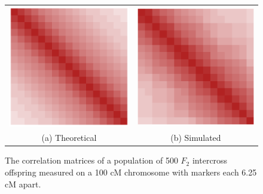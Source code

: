 \documentclass[sts]{imsart}
\begin{document}
\begin{figure}[h!]
  \begin{center}
    \begin{tabular}{cc}
      \includegraphics[scale=0.22]{../img/chevSimTheory.png} &
      \includegraphics[scale=0.22]{../img/chevSim.png} \\
      {\footnotesize (a) Theoretical} &
      {\footnotesize (b) Simulated} \\
    \end{tabular}
  \end{center}
  \caption{The correlation matrices of a population of 500 $F_2$ intercross offspring measured on a 100 cM chromosome with markers each 6.25 cM apart.}
  \label{fig:chevSims}
\end{figure}
\end{document}

